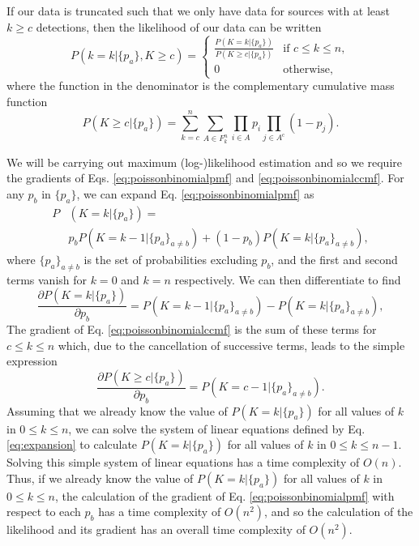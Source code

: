 \documentclass[fleqn,usenatbib]{mnras}
\begin{document}
If our data is truncated such that we only have data for sources with at least $k \geq c$ detections, then the likelihood of our data can be written
\begin{equation}
    P(k=k|\{p_a\},K \geq c) = \begin{cases} \frac{P(K=k|\{p_a\})}{P(K\geq c|\{p_a\})} &\mbox{if } c \leq k \leq n, \\
0 & \mbox{otherwise},\end{cases}
\end{equation}
where the function in the denominator is the complementary cumulative mass function
\begin{equation}
    P(K\geq c|\{p_a\}) = \sum_{k=c}^{n} \sum_{A\in F_k^n} \prod_{i\in A} p_i \prod_{j\in A^{\mathrm{c}}} (1-p_j).\label{eq:poissonbinomialccmf}
\end{equation}

We will be carrying out maximum (log-)likelihood estimation and so we require the gradients of Eqs. \ref{eq:poissonbinomialpmf} and \ref{eq:poissonbinomialccmf}. For any $p_b$ in $\{p_a\}$, we can expand Eq. \ref{eq:poissonbinomialpmf} as
\begin{align}
    P&(K=k|\{p_a\}) = \nonumber \\
    &p_b P(K=k-1|\{p_a\}_{a \neq b}) + (1-p_b)P(K=k|\{p_a\}_{a \neq b}), \label{eq:expansion}
\end{align}
where $\{p_a\}_{a \neq b}$ is the set of probabilities excluding $p_b$, and the first and second terms vanish for $k=0$ and $k=n$ respectively. We can then differentiate to find
\begin{equation}
    \frac{\partial P(K=k|\{p_a\})}{\partial p_b} = P(K=k-1|\{p_a\}_{a \neq b})-P(K=k|\{p_a\}_{a \neq b}),
\end{equation}
 The gradient of Eq. \ref{eq:poissonbinomialccmf} is the sum of these terms for $c\leq k \leq n$ which, due to the cancellation of successive terms, leads to the simple expression 
\begin{equation}
    \frac{\partial P(K \geq c|\{p_a\})}{\partial p_b} = P(K=c-1|\{p_a\}_{a \neq b}).
\end{equation}
Assuming that we already know the value of $P(K=k|\{p_a\})$ for all values of $k$ in $0\leq k \leq n$, we can solve the system of linear equations defined by Eq. \ref{eq:expansion} to calculate $P(K=k|\{p_a\})$ for all values of $k$ in $0\leq k \leq n-1$. Solving this simple system of linear equations has a time complexity of $O(n)$. Thus, if we already know the value of $P(K=k|\{p_a\})$ for all values of $k$ in $0\leq k \leq n$, the calculation of the gradient of Eq. \ref{eq:poissonbinomialpmf} with respect to each $p_b$ has a time complexity of $O(n^2)$, and so the calculation of the likelihood and its gradient has an overall time complexity of $O(n^2)$.
\end{document}
